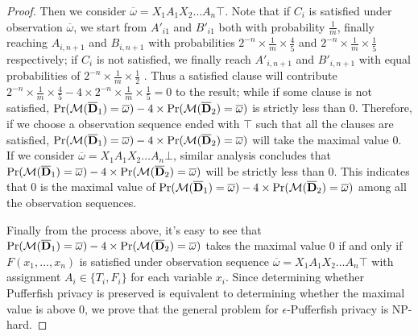 \begin{proof}
  Then we consider $\overline{\omega}=X_1A_1X_2\ldots A_n \top$. Note that if $C_i$ is satisfied under observation $\overline{\omega}$, we start from $A'_{i1}$ and $B'_{i1}$ both with
  probability $\frac{1}{m}$, finally reaching $A_{i,n+1}$ and $B_{i,n+1}$ with probabilities $2^{-n} \times \frac{1}{m} \times \frac{4}{5}$
  and $2^{-n} \times \frac{1}{m} \times \frac{1}{5}$ respectively;
  if $C_i$ is not satisfied, we finally reach $A'_{i,n+1}$ and $B'_{i,n+1}$  with equal probabilities of $2^{-n}\times \frac{1}{m} \times \frac{1}{2}$ .
  Thus a satisfied clause will contribute $2^{-n} \times \frac{1}{m} \times \frac{4}{5} - 4 \times 2^{-n} \times \frac{1}{m} \times \frac{1}{5} = 0$ to
  the result; while if some clause is not satisfied, $\Pr (\mathcal{M} (\overline{\mathbf{D}}_1) = \overline{\omega})- 4\times \Pr (\mathcal{M} (\overline{\mathbf{D}}_2) = \overline{\omega})$ is strictly less than $0$.
  Therefore, if we choose a observation sequence ended with $\top$ such that all the
  clauses are satisfied, $\Pr (\mathcal{M} (\overline{\mathbf{D}}_1) = \overline{\omega})- 4\times \Pr (\mathcal{M} (\overline{\mathbf{D}}_2) = \overline{\omega})$ will take the maximal value 0.
  If we consider $\overline{\omega}=X_1A_1X_2\ldots A_n \bot$, similar analysis concludes that $\Pr (\mathcal{M} (\overline{\mathbf{D}}_1) = \overline{\omega}) - 4 \times \Pr (\mathcal{M} (\overline{\mathbf{D}}_2) = \overline{\omega})$
  will be strictly less than $0$.
  This indicates that $0$ is the maximal value of $\Pr (\mathcal{M} (\overline{\mathbf{D}}_1) = \overline{\omega}) - 4 \times \Pr (\mathcal{M} (\overline{\mathbf{D}}_2) = \overline{\omega})$
  among all the observation sequences.

  Finally from the process above, it's easy to see that
  $\Pr (\mathcal{M} (\overline{\mathbf{D}}_1) = \overline{\omega}) - 4 \times \Pr (\mathcal{M} (\overline{\mathbf{D}}_2) = \overline{\omega})$ takes the maximal value $0$
  if and only if $F(x_1,\ldots,x_n)$ is satisfied under observation sequence $\overline{\omega}=X_1A_1X_2\ldots A_n \top$
  with assignment $A_i \in \{T_i,F_i\}$ for each variable $x_i$.
  Since determining whether Pufferfish privacy is preserved
  is equivalent to determining whether the maximal value is above $0$,
  we prove that the general problem for $\epsilon$-Pufferfish privacy is NP-hard.

\end{proof} 